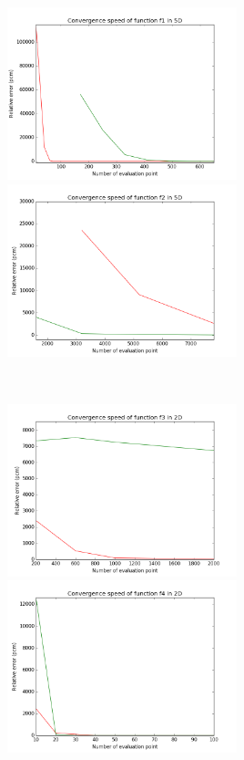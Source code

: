 \begin{center}
\begin{figure}[!h]
		\centering
		\begin{subfigure}[b]{0.3\textwidth}
				\includegraphics[width=\linewidth,height=5cm]{images/f1_5d.png}
				\includegraphics[width=\linewidth,height=5cm]{images/f2_5d.png}
		\end{subfigure}
		~
		\begin{subfigure}[b]{0.3\textwidth}
				\includegraphics[width=\linewidth,height=5cm]{images/f3_2d.png}
				\includegraphics[width=\linewidth,height=5cm]{images/f4_2d.png}

\end{subfigure}
\end{figure}
\end{center}
